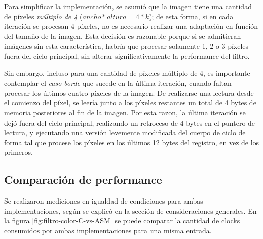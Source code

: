 Para simplificar la implementación, se asumió que la imagen tiene una cantidad de píxeles \emph{múltiplo de 4} ($ancho * altura = 4 * k$); de esta forma, si en cada iteración se procesan 4 píxeles, no es necesario realizar una adaptación en función del tamaño de la imagen. Esta decisión es razonable porque si se admitieran imágenes sin esta característica, habría que procesar solamente 1, 2 o 3 píxeles fuera del ciclo principal, sin alterar significativamente la performance del filtro.

Sin embargo, incluso para una cantidad de píxeles múltiplo de 4, es importante contemplar el \emph{caso borde} que sucede en la última iteración, cuando faltan procesar los últimos cuatro píxeles de la imagen. De realizarse una lectura desde el comienzo del píxel, se leería junto a los píxeles restantes un total de 4 bytes de memoria posteriores al fin de la imagen. Por esta razon, la última iteración se dejó fuera del ciclo principal, realizando un retroceso de 4 bytes en el puntero de lectura, y ejecutando una versión levemente modificada del cuerpo de ciclo de forma tal que procese los píxeles en los últimos 12 bytes del registro, en vez de los primeros.

\subsection{Comparación de performance}
\label{sub:comparaci_n_de_performance}

Se realizaron mediciones en igualdad de condiciones para ambas implementaciones, según se explicó en la sección de consideraciones generales. En la figura \ref{fig:filtro-color-C-vs-ASM} se puede comparar la cantidad de clocks consumidos por ambas implementaciones para una misma entrada.

